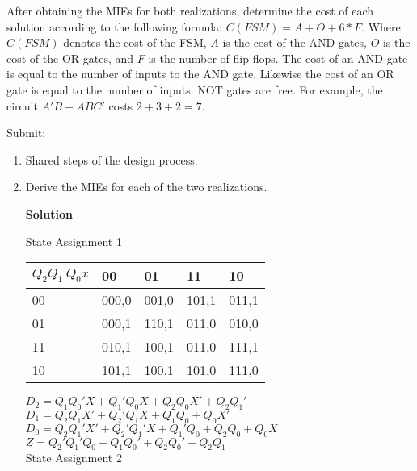 \begin{enumerate}
        After obtaining the MIEs for both realizations, determine the cost
        of each solution according to the following formula:
        $C(FSM) = A + O + 6*F$.  Where $C(FSM)$ denotes
        the cost of the FSM,
        $A$ is the cost of the AND gates,
        $O$ is the cost of the OR gates, and
        $F$ is the number of flip flops.
        The cost of an AND gate is equal to the number of inputs to the
        AND gate.  Likewise the cost of an OR gate is equal to the number
        of inputs.  NOT gates are free. For example, the circuit
        $A'B + ABC'$ costs $2+3+2=7$.

        Submit:
        \begin{enumerate}
            \item Shared steps of the design process.
            \item Derive the MIEs for each of the two realizations.
                \begin{onlysolution}  \textbf{Solution} \itshape{

                        State Assignment 1

                        \begin{tabular}{l|l|l|l|l}
                            $Q_2 Q_1 \ Q_0 x$  & 00 & 01  & 11 & 10 \\ \hline
                            00  & 000,0 & 001,0 & 101,1 & 011,1  \\ \hline
                            01  & 000,1 & 110,1 & 011,0 & 010,0  \\ \hline
                            11  & 010,1 & 100,1 & 011,0 & 111,1  \\ \hline
                            10  & 101,1 & 100,1 & 101,0 & 111,0  \\
                        \end{tabular}

                        $D_2 = Q_1Q_0'X + Q_1'Q_0X + Q_2Q_0X' + Q_2Q_1'$        \\
                        $D_1 = Q_2Q_1X' + Q_2'Q_1X + Q_1Q_0 + Q_0X'$            \\
                        $D_0 = Q_2Q_1'X' + Q_2'Q_1'X + Q_1'Q_0 + Q_2Q_0 + Q_0X$     \\
                        $Z   = Q_2'Q_1'Q_0 + Q_1Q_0' + Q_2Q_0' + Q_2Q_1$        \\

                        State Assignment 2

}
\end{onlysolution}
\end{enumerate}
\end{enumerate}
